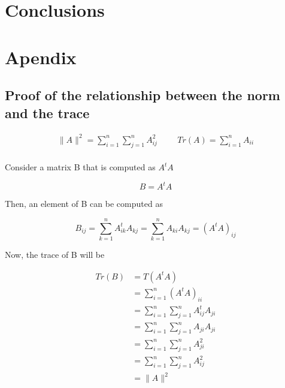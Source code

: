 \documentclass[12pt,journal]{IEEEtran}
\begin{document}
\section{Conclusions}


\section{Apendix}

    \subsection{Proof of the relationship between the norm and the trace} \label{norm_trace}

    \begin{equation*}
        \begin{aligned}
            \lVert A \rVert^2 = \sum_{i=1}^n \sum_{j=1}^n A_{ij}^2
            \hspace{1cm}
            Tr(A) = \sum_{i=1}^n A_{ii}
        \end{aligned}
    \end{equation*}\\

    Consider a matrix B that is computed as $A^tA$

    \begin{equation*}
        B = A^tA
    \end{equation*}

    Then, an element of B can be computed as

    \begin{equation*}
        B_{ij} = \sum_{k=1}^n A_{ik}^t A_{kj} = \sum_{k=1}^n A_{ki} A_{kj} = (A^tA)_{ij}
    \end{equation*}

    Now, the trace of B will be

    \begin{equation*}
        \begin{aligned}
            Tr(B) &= T(A^tA)\\
                  &= \sum_{i=1}^n (A^tA)_{ii}\\
                  &= \sum_{i=1}^n \sum_{j=1}^n A_{ij}^t A_{ji}\\
                  &= \sum_{i=1}^n \sum_{j=1}^n A_{ji} A_{ji}\\
                  &= \sum_{i=1}^n \sum_{j=1}^n A_{ji}^2 \\
                  &= \sum_{i=1}^n \sum_{j=1}^n A_{ij}^2 \\
                  &= \lVert A \rVert^2
        \end{aligned}
    \end{equation*}
\end{document}
